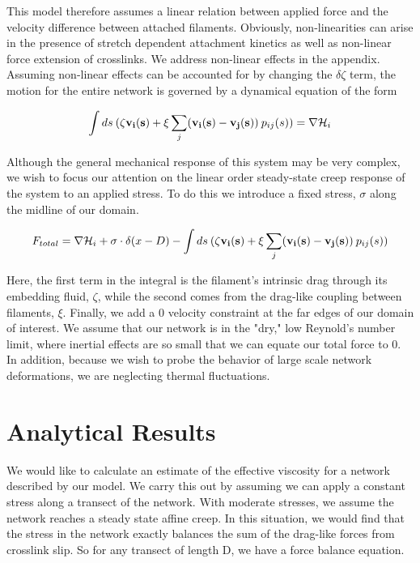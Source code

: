 \documentclass[prb,11pt]{revtex4-1}
\begin{document}
This model therefore assumes a linear relation between applied force and the velocity difference between attached filaments.  Obviously, non-linearities can arise in the presence of stretch dependent attachment kinetics as well as non-linear force extension of crosslinks.  We address non-linear effects in the appendix.  Assuming non-linear effects can be accounted for by changing the $\delta \zeta$ term, the motion for the entire network is governed by a dynamical equation of the form

\begin{equation}
\int ds \: (\mathbf{\zeta v_i(s)} + \xi \sum _j(\mathbf{v_i(s)}-\mathbf{v_j(s)}) \: p_{ij}(s))= \nabla {\cal H}_i
\end{equation}

Although the general mechanical response of this system may be very complex, we wish to focus our attention on the linear order steady-state creep response of the system to an applied stress.  To do this we introduce a fixed stress, $\sigma$ along the midline of our domain.

\begin{equation}
F_{total}= \nabla {\cal H}_i + \sigma\cdot\delta(x-D)- \int ds \: (\zeta\mathbf{v_i(s)} + \xi \sum _j(\mathbf{v_i(s)}-\mathbf{v_j(s)}) \: p_{ij}(s)) 
\end{equation}

Here, the first term in the integral is the filament's intrinsic drag through its embedding fluid, $\zeta$, while the second comes from the drag-like coupling between filaments, $\xi$.  Finally, we add a 0 velocity constraint at the far edges of our domain of interest.  We assume that our network is in the "dry," low Reynold's number limit, where inertial effects are so small that we can equate our total force to 0.  In addition, because we wish to probe the behavior of large scale network deformations, we are neglecting thermal fluctuations.  

\section{Analytical Results}
We would like to calculate an estimate of the effective viscosity for a network described by our model.  We carry this out by assuming we can apply a constant stress along a transect of the network.  With moderate stresses, we assume the network reaches a steady state affine creep. In this situation, we would find that the stress in the network exactly balances the sum of the drag-like forces from crosslink slip.  So for any transect of length D, we have a force balance equation.
\end{document}
